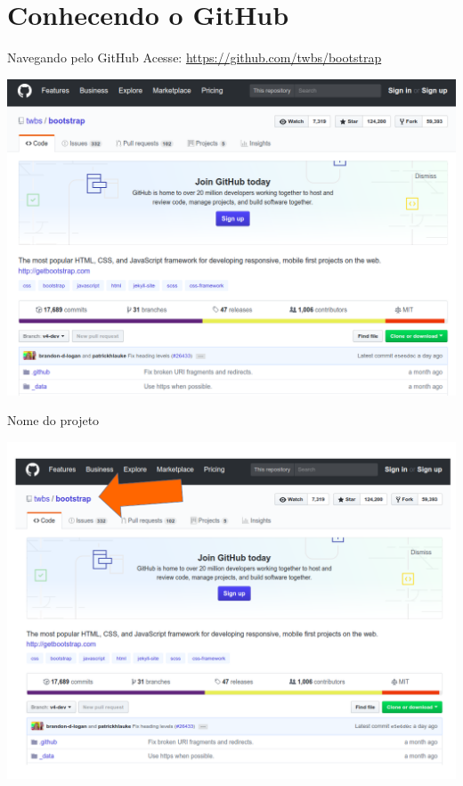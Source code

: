\documentclass{beamer}
\begin{document}
\section{Conhecendo o GitHub}
\begin{frame}{Navegando pelo GitHub}
  Acesse: 
  \href{https://github.com/twbs/bootstrap}{https://github.com/twbs/bootstrap}
  \begin{center}
       \includegraphics[height=0.7\paperheight]{print_github_1.png} \\
      \end{center}
 
\end{frame}
\begin{frame}{Nome do projeto}
  \begin{center}
       \includegraphics[height=0.7\paperheight]{nome_projeto.png} \\
      \end{center}
 
\end{frame}
\end{document}
